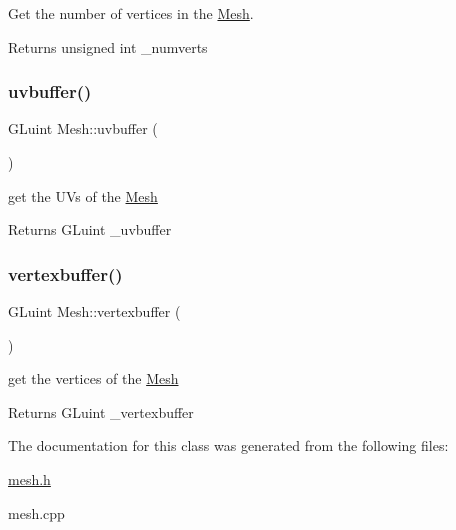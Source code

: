 Get the number of vertices in the \hyperlink{class_mesh}{Mesh}. 

\begin{DoxyReturn}{Returns}
unsigned int \+\_\+numverts 
\end{DoxyReturn}
\mbox{\label{class_mesh_a0c6e766bd06430ca8ad15a429c40311f}} 
\subsubsection{\texorpdfstring{uvbuffer()}{uvbuffer()}}
{\footnotesize\ttfamily G\+Luint Mesh\+::uvbuffer (\begin{DoxyParamCaption}{ }\end{DoxyParamCaption})\hspace{0.3cm}{\ttfamily [inline]}}



get the UV\textquotesingle{}s of the \hyperlink{class_mesh}{Mesh} 

\begin{DoxyReturn}{Returns}
G\+Luint \+\_\+uvbuffer 
\end{DoxyReturn}
\mbox{\label{class_mesh_a6b0627f41c3e14e8091972ca949d4ecc}} 
\subsubsection{\texorpdfstring{vertexbuffer()}{vertexbuffer()}}
{\footnotesize\ttfamily G\+Luint Mesh\+::vertexbuffer (\begin{DoxyParamCaption}{ }\end{DoxyParamCaption})\hspace{0.3cm}{\ttfamily [inline]}}



get the vertices of the \hyperlink{class_mesh}{Mesh} 

\begin{DoxyReturn}{Returns}
G\+Luint \+\_\+vertexbuffer 
\end{DoxyReturn}


The documentation for this class was generated from the following files\+:\begin{DoxyCompactItemize}
\item 
\hyperlink{mesh_8h}{mesh.\+h}\item 
mesh.\+cpp\end{DoxyCompactItemize}
